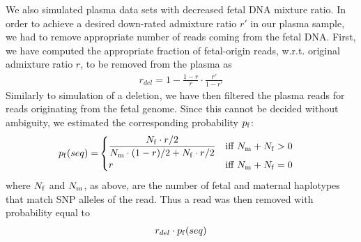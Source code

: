 	We also simulated plasma data sets with decreased fetal DNA mixture ratio. In order to achieve a desired down-rated admixture ratio $r'$ in our plasma sample, we had to remove appropriate number of reads coming from the fetal DNA. First, we have computed the appropriate fraction of fetal-origin reads, w.r.t. original admixture ratio $r$, to be removed from the plasma as
\begin{align}
r_{del} = 1 - \frac{1-r}{r} \cdot \frac{r'}{1-r'}
\end{align}
Similarly to simulation of a deletion, we have then filtered the plasma reads for reads originating from the fetal genome. Since this cannot be decided without ambiguity, we estimated the corresponding probability $p_{\mathrm{f}}$:
\begin{align}
p_\f(seq) =& 
  \begin{cases}
    \mathlarger{\frac{ N_\f \cdot r/2 }{ N_\m \cdot (1-r)/2 + N_\f \cdot r/2}} & \text{iff } N_\m+N_\f>0 \\
    r & \text{iff } N_\m+N_\f=0
  \end{cases}
\end{align}
where $N_{\mathrm{f}}$ and $N_{\mathrm{m}}$, as above, are the number of fetal and maternal haplotypes that match SNP alleles of the read. Thus a read was then removed with probability equal to
\begin{align}
r_{del} \cdot p_{\mathrm{f}}(seq)
\end{align}
